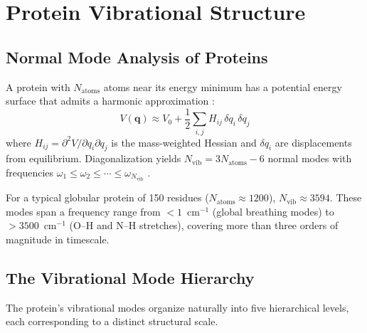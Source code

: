 \documentclass[11pt,twocolumn,a4paper]{article}
\theoremstyle{definition}
\theoremstyle{remark}
\newcommand{\Nvib}{N_{\mathrm{vib}}}
\begin{document}
\section{Protein Vibrational Structure}
\label{sec:vibrational_structure}

\subsection{Normal Mode Analysis of Proteins}

A protein with $N_{\mathrm{atoms}}$ atoms near its energy minimum has a potential energy surface that admits a harmonic approximation \citep{go1983}:
\begin{equation}
V(\mathbf{q}) \approx V_0 + \frac{1}{2} \sum_{i,j} H_{ij} \, \delta q_i \, \delta q_j
\label{eq:harmonic}
\end{equation}
where $H_{ij} = \partial^2 V / \partial q_i \partial q_j$ is the mass-weighted Hessian and $\delta q_i$ are displacements from equilibrium. Diagonalization yields $\Nvib = 3N_{\mathrm{atoms}} - 6$ normal modes with frequencies $\omega_1 \leq \omega_2 \leq \cdots \leq \omega_{\Nvib}$ \citep{tirion1996, bahar1997}.

For a typical globular protein of 150 residues ($N_{\mathrm{atoms}} \approx 1200$), $\Nvib \approx 3594$. These modes span a frequency range from $< 1$~cm$^{-1}$ (global breathing modes) to $> 3500$~cm$^{-1}$ (O--H and N--H stretches), covering more than three orders of magnitude in timescale.

\subsection{The Vibrational Mode Hierarchy}

The protein's vibrational modes organize naturally into five hierarchical levels, each corresponding to a distinct structural scale.
\end{document}
